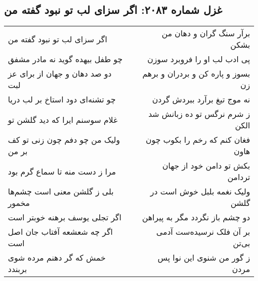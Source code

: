\begin{center}
\section*{غزل شماره ۲۰۸۳: اگر سزای لب تو نبود گفته من}
\label{sec:2083}
\begin{longtable}{l p{0.5cm} r}
اگر سزای لب تو نبود گفته من
&&
برآر سنگ گران و دهان من بشکن
\\
چو طفل بیهده گوید نه مادر مشفق
&&
پی ادب لب او را فروبرد سوزن
\\
دو صد دهان و جهان از برای عز لبت
&&
بسوز و پاره کن و بردران و برهم زن
\\
چو تشنه‌ای دود استاخ بر لب دریا
&&
نه موج تیغ برآرد ببردش گردن
\\
غلام سوسنم ایرا که دید گلشن تو
&&
ز شرم نرگس تو ده زبانش شد الکن
\\
ولیک من چو دفم چون زنی تو کف بر من
&&
فغان کنم که رخم را بکوب چون هاون
\\
مرا ز دست منه تا سماع گرم بود
&&
بکش تو دامن خود از جهان تردامن
\\
بلی ز گلشن معنی است چشم‌ها مخمور
&&
ولیک نغمه بلبل خوش است در گلشن
\\
اگر تجلی یوسف برهنه خوبتر است
&&
دو چشم باز نگردد مگر به پیراهن
\\
اگر چه شعشعه آفتاب جان اصل است
&&
بر آن فلک نرسیده‌ست آدمی بی‌تن
\\
خمش که گر دهنم مرده شوی بربندد
&&
ز گور من شنوی این نوا پس مردن
\\
\end{longtable}
\end{center}
